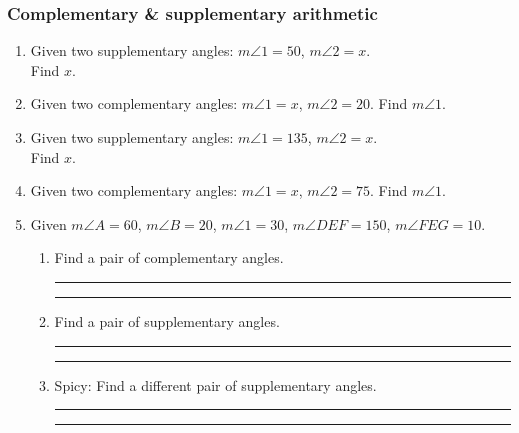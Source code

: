 \documentclass[12pt, oneside]{article}
\begin{document}
\subsubsection*{Complementary \& supplementary arithmetic}
  \begin{enumerate}
    \item Given two supplementary angles: $m \angle 1 = 50$, $m \angle 2 = x$.\\ Find $x$. %
    \item Given two complementary angles: $m \angle 1 = x$, $m \angle 2 = 20$. Find $m \angle 1$. %

    \item Given two supplementary angles: $m \angle 1 = 135$, $m \angle 2 = x$.\\ Find $x$. %
    \item Given two complementary angles: $m \angle 1 = x$, $m \angle 2 = 75$. Find $m \angle 1$. %

    \item Given $m \angle A=60$, $m \angle B=20$, $m \angle 1=30$, $m \angle DEF=150$, $m \angle FEG=10$. \bigskip
    \begin{enumerate}
      \item Find a pair of complementary angles. \rule{3cm}{0.15mm} \hspace{1cm} \rule{3cm}{0.15mm} \bigskip
      \item Find a pair of supplementary angles. \rule{3cm}{0.15mm} \hspace{1cm} \rule{3cm}{0.15mm} \bigskip
      \item Spicy: Find a different pair of supplementary angles. \rule{2cm}{0.15mm} \hspace{.5cm} \rule{2cm}{0.15mm}
      \end{enumerate}

    \end{enumerate}
\end{document}
